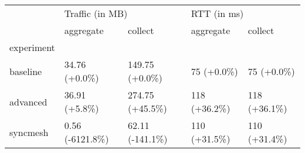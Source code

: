 \begin{tabular}{lllll}
\toprule
{} & \multicolumn{2}{l}{Traffic (in MB)} & \multicolumn{2}{l}{RTT (in ms)} \\
{} &        aggregate &          collect &     aggregate &       collect \\
experiment &                  &                  &               &               \\
\midrule
baseline   &    34.76 (+0.0\%) &   149.75 (+0.0\%) &    75 (+0.0\%) &    75 (+0.0\%) \\
advanced   &    36.91 (+5.8\%) &  274.75 (+45.5\%) &  118 (+36.2\%) &  118 (+36.1\%) \\
syncmesh   &  0.56 (-6121.8\%) &  62.11 (-141.1\%) &  110 (+31.5\%) &  110 (+31.4\%) \\
\bottomrule
\end{tabular}
